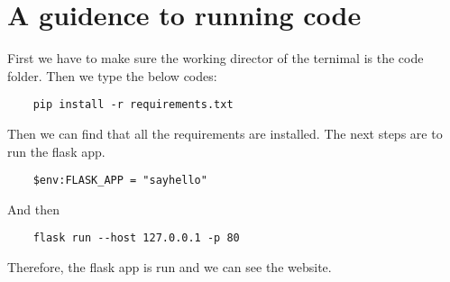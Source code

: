 \documentclass[
12pt, %
a4paper, %
oneside, %
headinclude,footinclude, %
BCOR5mm, %
]{scrartcl}
\begin{document}

\renewcommand{\refname}{\spacedlowsmallcaps{References}} %


\clearpage



\clearpage
\appendix
\section{A guidence to running code}
First we have to make sure the working director of the ternimal is the code folder. Then we type the below codes:
\begin{lstlisting}
    pip install -r requirements.txt
\end{lstlisting}
Then we can find that all the requirements are installed. The next steps are to run the flask app. 
\begin{lstlisting}
    $env:FLASK_APP = "sayhello"
\end{lstlisting}
And then
\begin{lstlisting}
    flask run --host 127.0.0.1 -p 80
\end{lstlisting}
Therefore, the flask app is run and we can see the website.
\end{document}
